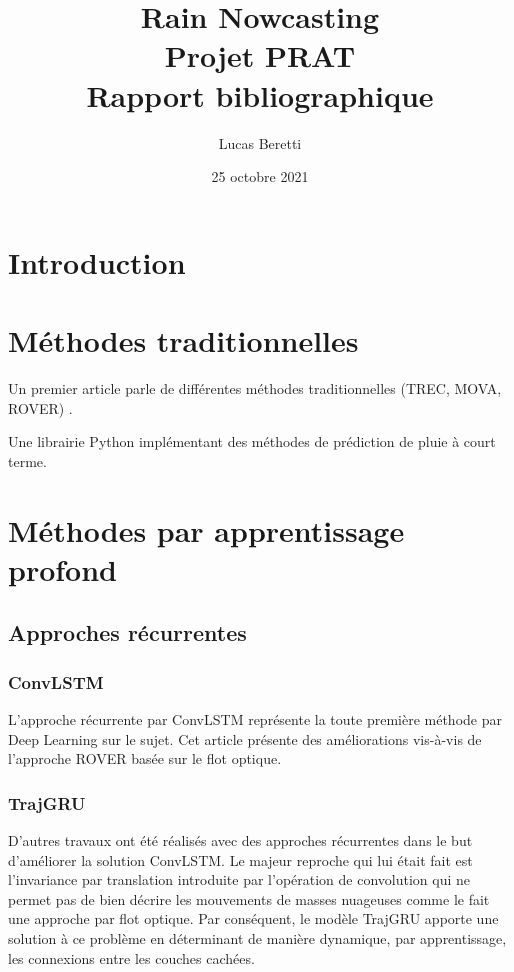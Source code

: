 \documentclass[11pt,a4paper,french]{article}
\title{\LARGE{Rain Nowcasting} \\ [0.5cm]\Large{Projet PRAT} \\ [0.25cm]\large{Rapport bibliographique}}
\author{Lucas Beretti}
\date{25 octobre 2021}
\begin{document}
\maketitle

\tableofcontents

\newpage

\section*{Introduction}

\section{Méthodes traditionnelles}

Un premier article parle de différentes méthodes traditionnelles (TREC, MOVA, ROVER) \cite{atmos8030048}. \newline

\noindentdent
Une librairie Python implémentant des méthodes de prédiction de pluie à court terme. \cite{article}

\section{Méthodes par apprentissage profond}

\subsection{Approches récurrentes}

\subsubsection{ConvLSTM}

L'approche récurrente par ConvLSTM représente la toute première méthode par Deep Learning sur le sujet. Cet article présente des améliorations vis-à-vis de l'approche ROVER basée sur le flot optique. \cite{shi2015convolutional}

\subsubsection{TrajGRU}

D'autres travaux ont été réalisés avec des approches récurrentes dans le but d'améliorer la solution ConvLSTM. Le majeur reproche qui lui était fait est l'invariance par translation introduite par l'opération de convolution qui ne permet pas de bien décrire les mouvements de masses nuageuses comme le fait une approche par flot optique. Par conséquent, le modèle TrajGRU apporte une solution à ce problème en déterminant de manière dynamique, par apprentissage, les connexions entre les couches cachées. \cite{shi2017deep}
\end{document}
